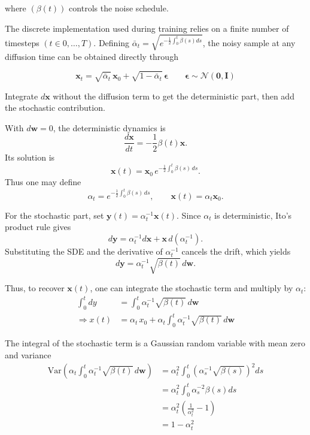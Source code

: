 where $(\beta(t))$ controls the noise schedule.

The discrete implementation used during training relies on a finite number of timesteps $(t\in{0,\ldots,T})$. Defining $\bar{\alpha}_t=\sqrt{e^{-\frac{1}{2}\int_0^t \beta(s) ds}}$, the noisy sample at any diffusion time can be obtained directly through

\begin{equation}
\mathbf{x}_t
=
\sqrt{\bar{\alpha}_t}\,\mathbf{x}_0
+
\sqrt{1-\bar{\alpha}_t}\,
\boldsymbol{\epsilon}
\qquad
\boldsymbol{\epsilon}
\sim
\mathcal{N}(\mathbf{0},\mathbf{I})
\label{eq:x_t}
\end{equation}

\begin{compactproof}[title={Proof}]
 Integrate $d\mathbf{x}$ without the diffusion term to get the
deterministic part, then add the stochastic contribution.

 With $d\mathbf{w}=0$, the deterministic dynamics is
\[
    \frac{d\mathbf{x}}{dt}
    =
    -\frac{1}{2}\beta(t)\mathbf{x}.
\]
Its solution is
\[
    \mathbf{x}(t)
    =
    \mathbf{x}_0
    \, e^{
        -\frac{1}{2}\int_0^t \beta(s)\,ds}.
\]
Thus one may define
\[
    \alpha_t
    = e^{
        -\frac{1}{2}\int_0^t \beta(s)\,ds},
    \qquad
    \mathbf{x}(t)=\alpha_t\mathbf{x}_0.
\]

 For the stochastic part, set
$\mathbf{y}(t)=\alpha_t^{-1}\mathbf{x}(t)$. Since $\alpha_t$ is deterministic,
Ito's product rule gives
\[
    d\mathbf{y}
    =
    \alpha_t^{-1}d\mathbf{x}
    +
    \mathbf{x}\,d(\alpha_t^{-1}).
\]
Substituting the SDE and the derivative of $\alpha_t^{-1}$ cancels the drift,
which yields
\[
    d\mathbf{y}
    =
    \alpha_t^{-1}\sqrt{\beta(t)}\,d\mathbf{w}.
\]

Thus, to recover $\mathbf{x}(t)$, one can integrate the stochastic term and multiply by $\alpha_t$:
\begin{align*}
    \int_{0}^{t} dy &= \int_{0}^{t} \alpha_t^{-1}\sqrt{\beta(t)}\,d\mathbf{w} \\
    \Rightarrow x(t) &= \alpha_t \, x_0 + \alpha_t \int_{0}^{t} \alpha_t^{-1}\sqrt{\beta(t)}\,d\mathbf{w}
\end{align*}

 The integral of the stochastic term is a Gaussian random variable with mean zero and variance
\begin{align*}
    \text{Var}\left(\alpha_t \int_{0}^{t} \alpha_t^{-1}\sqrt{\beta(t)}\,d\mathbf{w}\right)
    &= \alpha_t^2 \int_{0}^{t} (\alpha_s^{-1}\sqrt{\beta(s)})^2 ds \\
    &= \alpha_t^2 \int_{0}^{t} \alpha_s^{-2} \beta(s) ds \\
    &= \alpha_t^2 \left( \frac{1}{\alpha_t^2} -1 \right) \\
    &= 1 - \alpha_t^2
\end{align*}



\end{compactproof}
